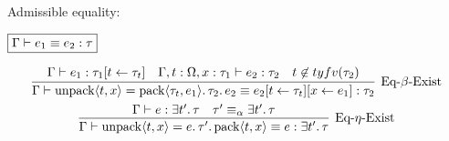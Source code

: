 Admissible equality:

$\fbox{$\Gamma \vdash e_1 \equiv e_2: \tau$}$

\begin{gather*}
  \infer[\text{Eq-$\beta$-Exist}]{\Gamma \vdash \symunpack\langle t, x\rangle = \sympack\langle \tau_t, e_1\rangle\ldotp \tau_2\ldotp e_2 \equiv e_2[t \assign \tau_t][x \assign e_1]: \tau_2}{
    \Gamma \vdash e_1: \tau_1[t \assign \tau_t]
    &
    \Gamma, t: \Omega, x: \tau_1 \vdash e_2: \tau_2
    &
    t \not\in \typefreevar(\tau_2)
  }
  \\
  \infer[\text{Eq-$\eta$-Exist}]{\Gamma \vdash \symunpack\langle t, x\rangle = e\ldotp\tau'\ldotp \sympack\langle t, x\rangle \equiv e: \exists t'\ldotp \tau}{
    \Gamma \vdash e: \exists t'\ldotp \tau
    &
    \tau' \equiv_\alpha \exists t'\ldotp \tau
  }
\end{gather*}
